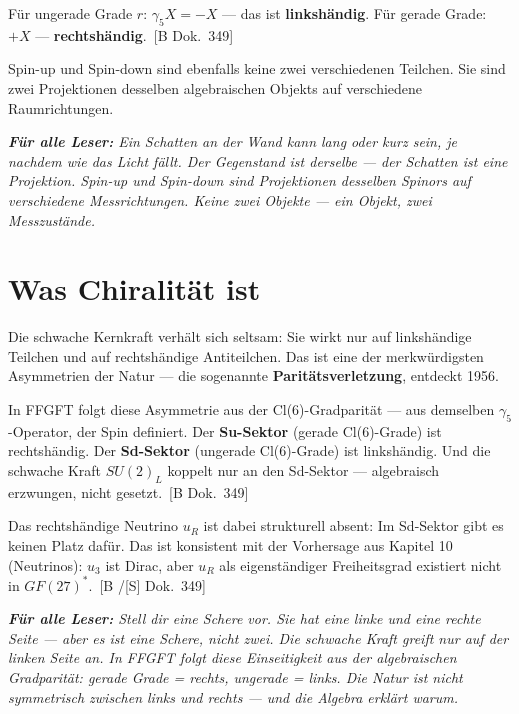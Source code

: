 \documentclass[11pt,oneside]{book}
\newcommand{\status}[1]{\penalty10000\,{\scriptsize\textcolor{gray!60}{[#1]}}}
\newenvironment{laierspur}{%
  \par\vspace{4pt}%
  \noindent\small\itshape\color{blue!60!black}%
  \textbf{Für alle Leser:}\enspace\ignorespaces}{%
  \par\vspace{4pt}\normalsize\normalfont\normalcolor}
\begin{document}
Für ungerade Grade $r$: $\gamma_5 X = -X$ --- das ist
\textbf{linkshändig}. Für gerade Grade: $+X$ ---
\textbf{rechtshändig}. \status{B Dok.~349}

Spin-up und Spin-down sind ebenfalls keine zwei verschiedenen Teilchen.
Sie sind zwei Projektionen desselben algebraischen Objekts auf verschiedene
Raumrichtungen.

\begin{laierspur}
Ein Schatten an der Wand kann lang oder kurz sein, je nachdem wie das
Licht fällt. Der Gegenstand ist derselbe --- der Schatten ist eine
Projektion. Spin-up und Spin-down sind Projektionen desselben Spinors
auf verschiedene Messrichtungen. Keine zwei Objekte --- ein Objekt,
zwei Messzustände.
\end{laierspur}

\section*{Was Chiralität ist}

Die schwache Kernkraft verhält sich seltsam: Sie wirkt nur auf
linkshändige Teilchen und auf rechtshändige Antiteilchen. Das ist eine
der merkwürdigsten Asymmetrien der Natur --- die sogenannte
\textbf{Paritätsverletzung}, entdeckt 1956.

In FFGFT folgt diese Asymmetrie aus der Cl(6)-Gradparität --- aus
demselben $\gamma_5$-Operator, der Spin definiert. Der
\textbf{Su-Sektor} (gerade Cl(6)-Grade) ist rechtshändig. Der
\textbf{Sd-Sektor} (ungerade Cl(6)-Grade) ist linkshändig. Und die
schwache Kraft $SU(2)_L$ koppelt nur an den Sd-Sektor --- algebraisch
erzwungen, nicht gesetzt. \status{B Dok.~349}

Das rechtshändige Neutrino $
u_R$ ist dabei strukturell absent:
Im Sd-Sektor gibt es keinen Platz dafür. Das ist konsistent mit der
Vorhersage aus Kapitel 10 (Neutrinos): $
u_3$ ist Dirac, aber
$
u_R$ als eigenständiger Freiheitsgrad existiert nicht in
$GF(27)^*$. \status{B /[S] Dok.~349}

\begin{laierspur}
Stell dir eine Schere vor. Sie hat eine linke und eine rechte Seite ---
aber es ist eine Schere, nicht zwei. Die schwache Kraft greift nur
auf der linken Seite an. In FFGFT folgt diese Einseitigkeit aus der
algebraischen Gradparität: gerade Grade = rechts, ungerade = links.
Die Natur ist nicht symmetrisch zwischen links und rechts ---
und die Algebra erklärt warum.
\end{laierspur}
\end{document}
